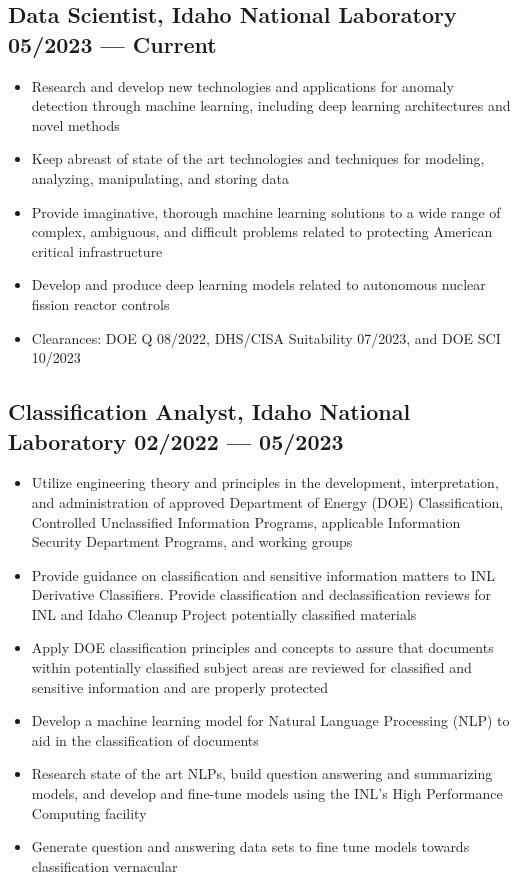 \documentclass[letterpaper,11pt]{article}
\begin{document}
\subsection*{{\color{cvblue}Data Scientist, Idaho National Laboratory } \hfill 05/2023 — Current} 
\begin{itemize}
    \setlength{\itemsep}{-.5pt}
    \item  Research and develop new technologies and applications for anomaly detection through machine learning, including deep learning architectures and novel methods
    \item  Keep abreast of state of the art technologies and techniques for modeling, analyzing, manipulating, and storing data
    \item  Provide imaginative, thorough machine learning solutions to a wide range of complex, ambiguous, and difficult problems related to protecting American critical infrastructure
    \item  Develop and produce deep learning models related to autonomous nuclear fission reactor controls
    \item  Clearances: DOE Q 08/2022, DHS/CISA Suitability 07/2023, and DOE SCI 10/2023
\end{itemize}


\subsection*{{\color{cvblue}Classification Analyst, Idaho National Laboratory } \hfill 02/2022 — 05/2023} 
 
\begin{itemize}
    \setlength{\itemsep}{-.5pt}
    \item  Utilize engineering theory and principles in the development, interpretation, and administration of approved Department of Energy (DOE) Classification, Controlled Unclassified Information Programs, applicable Information
    Security Department Programs, and working groups
    \item  Provide guidance on classification and sensitive information matters to INL Derivative Classifiers. Provide classification and declassification reviews for INL and Idaho Cleanup Project potentially classified materials
    \item  Apply DOE classification principles and concepts to assure that documents within potentially classified subject areas are reviewed for classified and sensitive information and are properly protected
    \item  Develop a machine learning model for Natural Language Processing (NLP) to aid in the classification of documents
    \item  Research state of the art NLPs, build question answering and summarizing models, and develop and fine-tune models using the INL’s High Performance Computing facility
    \item  Generate question and answering data sets to fine tune models towards classification vernacular
\end{itemize}
\end{document}
